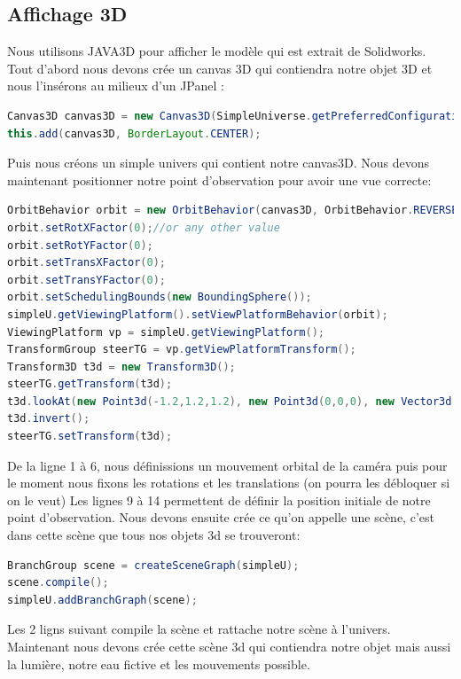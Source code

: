 \documentclass[a4paper,11pt]{report}
\begin{document}
		\subsection{Affichage 3D}
			\label{subsec:Affichage 3D}
			Nous utilisons JAVA3D pour afficher le modèle qui est extrait de Solidworks.
			\newline Tout d'abord nous devons crée un canvas 3D qui contiendra notre objet 3D et nous l’insérons au milieux d'un JPanel :
		\begin{lstlisting}[language=java]
Canvas3D canvas3D = new Canvas3D(SimpleUniverse.getPreferredConfiguration());
this.add(canvas3D, BorderLayout.CENTER);
		\end{lstlisting}
		Puis nous créons un simple univers qui contient notre canvas3D.
		\newline Nous devons maintenant positionner notre point d'observation pour avoir une vue correcte:
		\begin{lstlisting}[language=java]
OrbitBehavior orbit = new OrbitBehavior(canvas3D, OrbitBehavior.REVERSE_ROTATE);
orbit.setRotXFactor(0);//or any other value
orbit.setRotYFactor(0);
orbit.setTransXFactor(0);
orbit.setTransYFactor(0);
orbit.setSchedulingBounds(new BoundingSphere());
simpleU.getViewingPlatform().setViewPlatformBehavior(orbit);
ViewingPlatform vp = simpleU.getViewingPlatform();
TransformGroup steerTG = vp.getViewPlatformTransform();
Transform3D t3d = new Transform3D();
steerTG.getTransform(t3d);
t3d.lookAt(new Point3d(-1.2,1.2,1.2), new Point3d(0,0,0), new Vector3d(0,1,0));
t3d.invert();
steerTG.setTransform(t3d);
		\end{lstlisting}
		De la ligne 1 à 6, nous définissions un mouvement orbital de la caméra puis pour le moment nous fixons les rotations et les translations (on pourra les débloquer si on le veut)
		\newline Les lignes 9 à 14 permettent de définir la position initiale de notre point d'observation.
		\newline Nous devons ensuite crée ce qu'on appelle une scène, c'est dans cette scène que tous nos objets 3d se trouveront:
		\begin{lstlisting}[language=java]
BranchGroup scene = createSceneGraph(simpleU);
scene.compile();
simpleU.addBranchGraph(scene);
		\end{lstlisting}
		Les 2 ligns suivant compile la scène et rattache notre scène à l'univers.
		\newline \newline Maintenant nous devons crée cette scène 3d qui contiendra notre objet mais aussi la lumière, notre eau fictive et les mouvements possible.
\end{document}
